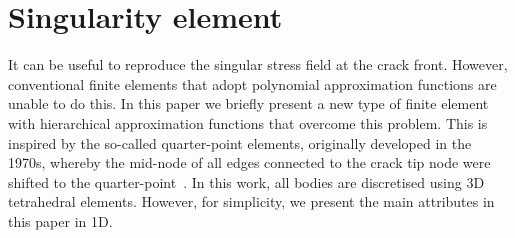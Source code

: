 \documentclass[review]{elsarticle}
\numberwithin{equation}{section}
\begin{document}
%
%
%

\section{Singularity element}

It can be useful to reproduce the singular stress field at the crack front. However, conventional finite elements that adopt polynomial approximation functions are unable to do this. 
In this paper we briefly present a new type of finite element with hierarchical approximation functions that overcome this problem. This is inspired by the so-called quarter-point elements, originally developed in the 1970s, whereby the mid-node of all edges connected to the crack tip node were shifted to the quarter-point~\citep{barsoum1976use,henshell1975crack}. In this work, all bodies are discretised using 3D tetrahedral elements. However, for simplicity, we present the main attributes in this paper in 1D.
\end{document}
